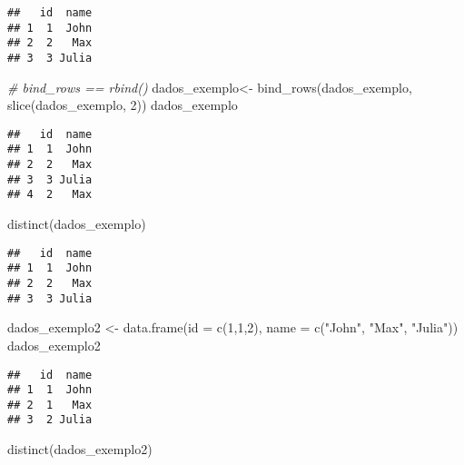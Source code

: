 \documentclass[
]{book}
\newenvironment{Shaded}{\begin{snugshade}}{\end{snugshade}}
\newcommand{\AttributeTok}[1]{\textcolor[rgb]{0.77,0.63,0.00}{#1}}
\newcommand{\CommentTok}[1]{\textcolor[rgb]{0.56,0.35,0.01}{\textit{#1}}}
\newcommand{\DecValTok}[1]{\textcolor[rgb]{0.00,0.00,0.81}{#1}}
\newcommand{\FunctionTok}[1]{\textcolor[rgb]{0.00,0.00,0.00}{#1}}
\newcommand{\NormalTok}[1]{#1}
\newcommand{\OtherTok}[1]{\textcolor[rgb]{0.56,0.35,0.01}{#1}}
\newcommand{\StringTok}[1]{\textcolor[rgb]{0.31,0.60,0.02}{#1}}
\begin{document}
\begin{verbatim}
##   id  name
## 1  1  John
## 2  2   Max
## 3  3 Julia
\end{verbatim}

\begin{Shaded}
\begin{Highlighting}[]
\CommentTok{\# bind\_rows == rbind()}
\NormalTok{dados\_exemplo}\OtherTok{\textless{}{-}} \FunctionTok{bind\_rows}\NormalTok{(dados\_exemplo, }\FunctionTok{slice}\NormalTok{(dados\_exemplo, }\DecValTok{2}\NormalTok{)) }
\NormalTok{dados\_exemplo}
\end{Highlighting}
\end{Shaded}

\begin{verbatim}
##   id  name
## 1  1  John
## 2  2   Max
## 3  3 Julia
## 4  2   Max
\end{verbatim}

\begin{Shaded}
\begin{Highlighting}[]
\FunctionTok{distinct}\NormalTok{(dados\_exemplo)}
\end{Highlighting}
\end{Shaded}

\begin{verbatim}
##   id  name
## 1  1  John
## 2  2   Max
## 3  3 Julia
\end{verbatim}

\begin{Shaded}
\begin{Highlighting}[]
\NormalTok{dados\_exemplo2 }\OtherTok{\textless{}{-}} \FunctionTok{data.frame}\NormalTok{(}\AttributeTok{id =} \FunctionTok{c}\NormalTok{(}\DecValTok{1}\NormalTok{,}\DecValTok{1}\NormalTok{,}\DecValTok{2}\NormalTok{),}
                         \AttributeTok{name =} \FunctionTok{c}\NormalTok{(}\StringTok{"John"}\NormalTok{, }\StringTok{"Max"}\NormalTok{, }\StringTok{"Julia"}\NormalTok{))}
\NormalTok{dados\_exemplo2}
\end{Highlighting}
\end{Shaded}

\begin{verbatim}
##   id  name
## 1  1  John
## 2  1   Max
## 3  2 Julia
\end{verbatim}

\begin{Shaded}
\begin{Highlighting}[]
\FunctionTok{distinct}\NormalTok{(dados\_exemplo2)}
\end{Highlighting}
\end{Shaded}
\end{document}

